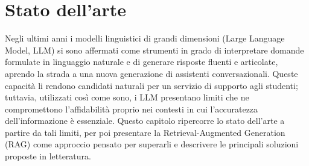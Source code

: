 \chapter{Stato dell'arte}\label{cap:stato_arte}

Negli ultimi anni i modelli linguistici di grandi dimensioni (Large Language Model, LLM) si sono affermati come strumenti in grado di interpretare domande formulate in linguaggio naturale e di generare risposte fluenti e articolate, aprendo la strada a una nuova generazione di assistenti conversazionali. Queste capacità li rendono candidati naturali per un servizio di supporto agli studenti; tuttavia, utilizzati così come sono, i LLM presentano limiti che ne compromettono l’affidabilità proprio nei contesti in cui l’accuratezza dell’informazione è essenziale. Questo capitolo ripercorre lo stato dell’arte a partire da tali limiti, per poi presentare la Retrieval-Augmented Generation (RAG) come approccio pensato per superarli e descrivere le principali soluzioni proposte in letteratura.








